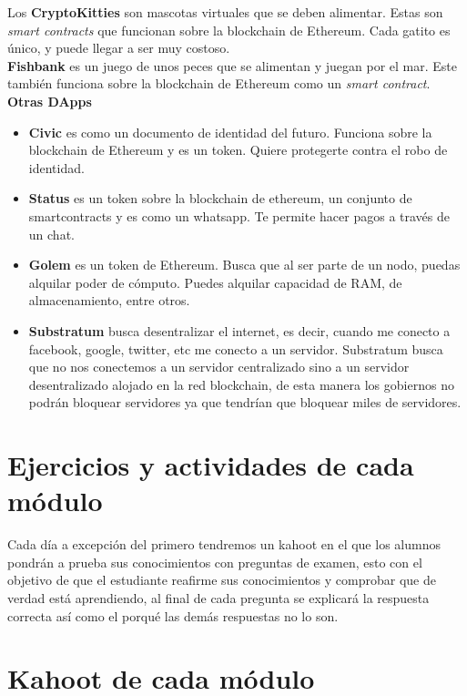 \documentclass[a4paper,12pt]{lib/pub}
\begin{document}
Los \textbf{CryptoKitties} son mascotas virtuales que se deben alimentar. Estas son \textit{smart contracts} que funcionan sobre la blockchain de Ethereum. Cada gatito es único, y puede llegar a ser muy costoso.\\

\textbf{Fishbank} es un juego de unos peces que se alimentan y juegan por el mar. Este también funciona sobre la blockchain de Ethereum como un \textit{smart contract}.\\

\textbf{Otras DApps}
	\begin{itemize}
	\item \textbf{Civic} es como un documento de identidad del futuro. Funciona sobre la blockchain de Ethereum y es un token. Quiere protegerte contra el robo de identidad.
	\item \textbf{Status} es un token sobre la blockchain de ethereum, un conjunto de smartcontracts y es como un whatsapp. Te permite hacer pagos a través de un chat.
	\item \textbf{Golem} es un token de Ethereum. Busca que al ser parte de un nodo, puedas alquilar poder de cómputo. Puedes alquilar capacidad de RAM, de almacenamiento, entre otros.
	\item \textbf{Substratum} busca desentralizar el internet, es decir, cuando me conecto a facebook, google, twitter, etc me conecto a un servidor. Substratum busca que no nos conectemos a un servidor centralizado sino a un servidor desentralizado alojado en la red blockchain, de esta manera los gobiernos no podrán bloquear servidores ya que tendrían que bloquear miles de servidores.
\end{itemize}

\section{Ejercicios y actividades de cada módulo}
Cada día a excepción del primero tendremos un kahoot en el que los alumnos pondrán a prueba sus conocimientos con preguntas de examen, esto con el objetivo de que el estudiante reafirme sus conocimientos y comprobar que de verdad está aprendiendo, al final de cada pregunta se explicará la respuesta correcta así como el porqué las demás respuestas no lo son.

\section{Kahoot de cada módulo}
\end{document}
